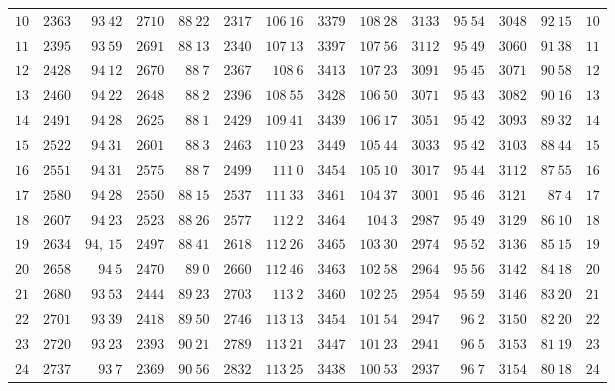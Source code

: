 \begin{center}
\begin{tabular}{r|r|r|r|r|r|r|r|r|r|r|r|r|r}
$10$ & $2363$ & $93\ 42$ & $2710$ & $88\ 22$ & $2317$ & $106\ 16$ & $3379$ & $108\ 28$ & $3133$ & $95\ 54$ & $3048$ & $92\ 15$ & $10$ \\[3pt]
$11$ & $2395$ & $93\ 59$ & $2691$ & $88\ 13$ & $2340$ & $107\ 13$ & $3397$ & $107\ 56$ & $3112$ & $95\ 49$ & $3060$ & $91\ 38$ & $11$ \\
$12$ & $2428$ & $94\ 12$ & $2670$ & $88\ 7$ & $2367$ & $108\ 6$ & $3413$ & $107\ 23$ & $3091$ & $95\ 45$ & $3071$ & $90\ 58$ & $12$ \\
$13$ & $2460$ & $94\ 22$ & $2648$ & $88\ 2$ & $2396$ & $108\ 55$ & $3428$ & $106\ 50$ & $3071$ & $95\ 43$ & $3082$ & $90\ 16$ & $13$ \\
$14$ & $2491$ & $94\ 28$ & $2625$ & $88\ 1$ & $2429$ & $109\ 41$ & $3439$ & $106\ 17$ & $3051$ & $95\ 42$ & $3093$ & $89\ 32$ & $14$ \\
$15$ & $2522$ & $94\ 31$ & $2601$ & $88\ 3$ & $2463$ & $110\ 23$ & $3449$ & $105\ 44$ & $3033$ & $95\ 42$ & $3103$ & $88\ 44$ & $15$ \\[3pt]
$16$ & $2551$ & $94\ 31$ & $2575$ & $88\ 7$ & $2499$ & $111\ 0$ & $3454$ & $105\ 10$ & $3017$ & $95\ 44$ & $3112$ & $87\ 55$ & $16$ \\
$17$ & $2580$ & $94\ 28$ & $2550$ & $88\ 15$ & $2537$ & $111\ 33$ & $3461$ & $104\ 37$ & $3001$ & $95\ 46$ & $3121$ & $87\ 4$ & $17$ \\
$18$ & $2607$ & $94\ 23$ & $2523$ & $88\ 26$ & $2577$ & $112\ 2$ & $3464$ & $104\ 3$ & $2987$ & $95\ 49$ & $3129$ & $86\ 10$ & $18$ \\
$19$ & $2634$ & $94,\ 15$ & $2497$ & $88\ 41$ & $2618$ & $112\ 26$ & $3465$ & $103\ 30$ & $2974$ & $95\ 52$ & $3136$ & $85\ 15$ & $19$ \\
$20$ & $2658$ & $94\ 5$ & $2470$ & $89\ 0$ & $2660$ & $112\ 46$ & $3463$ & $102\ 58$ & $2964$ & $95\ 56$ & $3142$ & $84\ 18$ & $20$ \\[3pt]
$21$ & $2680$ & $93\ 53$ & $2444$ & $89\ 23$ & $2703$ & $113\ 2$ & $3460$ & $102\ 25$ & $2954$ & $95\ 59$ & $3146$ & $83\ 20$ & $21$ \\
$22$ & $2701$ & $93\ 39$ & $2418$ & $89\ 50$ & $2746$ & $113\ 13$ & $3454$ & $101\ 54$ & $2947$ & $96\ 2$ & $3150$ & $82\ 20$ & $22$ \\
$23$ & $2720$ & $93\ 23$ & $2393$ & $90\ 21$ & $2789$ & $113\ 21$ & $3447$ & $101\ 23$ & $2941$ & $96\ 5$ & $3153$ & $81\ 19$ & $23$ \\
$24$ & $2737$ & $93\ 7$ & $2369$ & $90\ 56$ & $2832$ & $113\ 25$ & $3438$ & $100\ 53$ & $2937$ & $96\ 7$ & $3154$ & $80\ 18$ & $24$ \\

\end{tabular}
\end{center}

